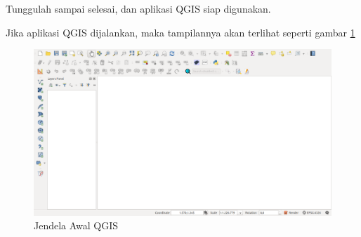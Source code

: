 \begin{enumerate}[A.]
\begin{enumerate}[1.]
Tunggulah sampai selesai, dan aplikasi QGIS siap digunakan. 
\end{enumerate}

Jika aplikasi QGIS dijalankan, maka tampilannya akan terlihat seperti gambar \ref{fig:tampilan-awal-qgis}

\begin{figure}[H]
  \centering
  \includegraphics[width=1\textwidth]{./resources/003-jendela-awal-qgis}
  \caption{Jendela Awal QGIS}
  \label{fig:tampilan-awal-qgis}
\end{figure}

\end{enumerate}
